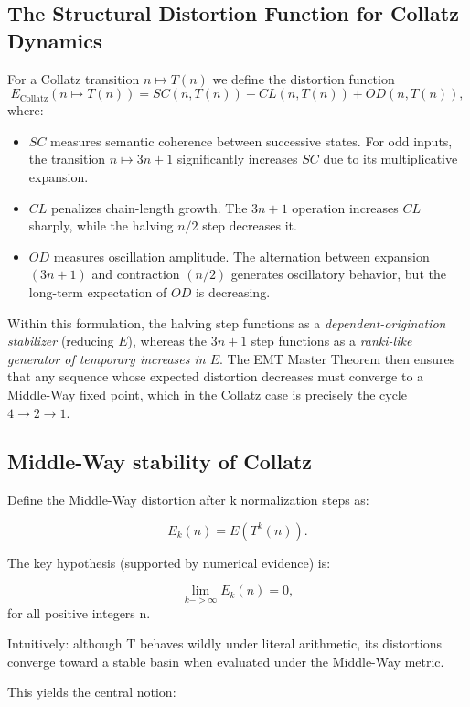 \documentclass[11pt]{article}
\theoremstyle{definition}
\theoremstyle{remark}
\begin{document}
\subsection{The Structural Distortion Function for Collatz Dynamics}

For a Collatz transition $n \mapsto T(n)$ we define the distortion
function
\[
E_{\text{Collatz}}(n \mapsto T(n)) 
  = SC(n,T(n)) + CL(n,T(n)) + OD(n,T(n)),
\]
where:

\begin{itemize}
\item $SC$ measures semantic coherence between successive states.
      For odd inputs, the transition $n \mapsto 3n+1$ significantly
      increases $SC$ due to its multiplicative expansion.
\item $CL$ penalizes chain-length growth. The $3n+1$ operation increases
      $CL$ sharply, while the halving $n/2$ step decreases it.
\item $OD$ measures oscillation amplitude. The alternation between
      expansion $(3n+1)$ and contraction $(n/2)$ generates oscillatory
      behavior, but the long-term expectation of $OD$ is decreasing.
\end{itemize}

Within this formulation, the halving step functions as a
\emph{dependent-origination stabilizer} (reducing $E$), whereas the
$3n+1$ step functions as a \emph{ranki-like generator of temporary
increases in $E$}. The EMT Master Theorem then ensures that any sequence
whose expected distortion decreases must converge to a Middle-Way
fixed point, which in the Collatz case is precisely the cycle
$4 \to 2 \to 1$.

\subsection{Middle-Way stability of Collatz}

Define the Middle-Way distortion after k normalization steps as:

\[
  E_k(n) = E(T^k(n)).
\]

The key hypothesis (supported by numerical evidence) is:

\[
  \lim_{k->\infty} E_k(n) = 0,
\]
for all positive integers n.

Intuitively: although T behaves wildly under literal arithmetic,
its distortions converge toward a stable basin when evaluated under the
Middle-Way metric.

This yields the central notion:
\end{document}
